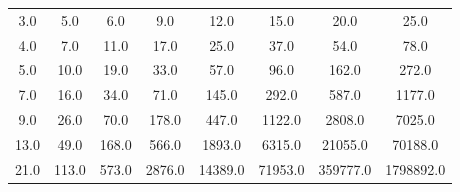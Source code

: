 \begin{tabular}{cccccccc}
\hline
3.0 & 5.0 & 6.0 & 9.0 & 12.0 & 15.0 & 20.0 & 25.0 \\
4.0 & 7.0 & 11.0 & 17.0 & 25.0 & 37.0 & 54.0 & 78.0 \\
5.0 & 10.0 & 19.0 & 33.0 & 57.0 & 96.0 & 162.0 & 272.0 \\
7.0 & 16.0 & 34.0 & 71.0 & 145.0 & 292.0 & 587.0 & 1177.0 \\
9.0 & 26.0 & 70.0 & 178.0 & 447.0 & 1122.0 & 2808.0 & 7025.0 \\
13.0 & 49.0 & 168.0 & 566.0 & 1893.0 & 6315.0 & 21055.0 & 70188.0 \\
21.0 & 113.0 & 573.0 & 2876.0 & 14389.0 & 71953.0 & 359777.0 & 1798892.0 \\
\hline
\end{tabular}
